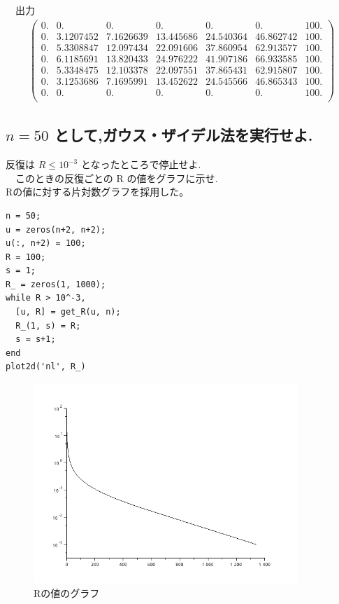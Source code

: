 \documentclass{scrartcl}
\begin{document}
　出力\\
\begin{eqnarray*}
\left(   \begin{array}{lllllll}
0. & 0.        & 0.        & 0.        & 0.        & 0.        & 100. \\
0. & 3.1207452 & 7.1626639 & 13.445686 & 24.540364 & 46.862742 & 100. \\
0. & 5.3308847 & 12.097434 & 22.091606 & 37.860954 & 62.913577 & 100. \\
0. & 6.1185691 & 13.820433 & 24.976222 & 41.907186 & 66.933585 & 100. \\
0. & 5.3348475 & 12.103378 & 22.097551 & 37.865431 & 62.915807 & 100. \\
0. & 3.1253686 & 7.1695991 & 13.452622 & 24.545566 & 46.865343 & 100. \\
0. & 0.        & 0.        & 0.        & 0.        & 0.        & 100. \\
\end{array} \right)    
\end{eqnarray*}
\subsection{\(n = 50\) として,ガウス・ザイデル法を実行せよ.}
\label{sec:org403e795}
反復は \(R \leq 10^{-3}\) となったところで停止せよ.\\
　このときの反復ごとの R の値をグラフに示せ.\\
Rの値に対する片対数グラフを採用した。\\
\begin{verbatim}
n = 50;
u = zeros(n+2, n+2);
u(:, n+2) = 100;
R = 100;
s = 1;
R_ = zeros(1, 1000);
while R > 10^-3,
  [u, R] = get_R(u, n);
  R_(1, s) = R;
  s = s+1;
end
plot2d('nl', R_)
\end{verbatim}

\begin{figure}[htbp]
\centering
\includegraphics[width=10cm]{./1-3.png}
\caption{Rの値のグラフ}
\end{figure}
\end{document}
